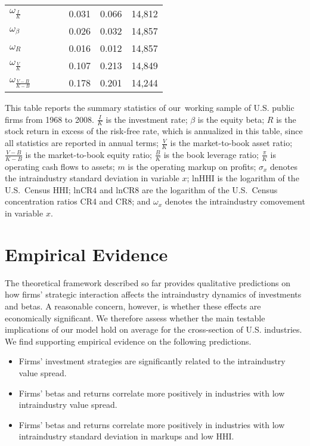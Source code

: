 \documentclass[nogrid,nosurname,sort&compress]{RFS}
\begin{document}
\begin{table}[!t]
{\begin{tabular*}{\textwidth}{@{\extracolsep{\fill}}lrrrrrr@{}}
$\omega_{\frac{I}{K}}$ &       &       &       & 0.031 & 0.066 & 14,812 \\
$\omega_{\beta}$ &       &       &       & 0.026 & 0.032 & 14,857 \\
$\omega_{R}$ &       &       &       & 0.016 & 0.012 & 14,857 \\
$\omega_{\frac{V}{K}}$ &       &       &       & 0.107 & 0.213 & 14,849 \\
$\omega_{\frac{V-B}{K-B}}$ &       &       &       & 0.178 & 0.201 & 14,244 \\\bottomrule
\end{tabular*}}
{This table reports the summary statistics of our\ working sample of U.S.
public firms from 1968 to 2008. $\frac{I}{K}$ is the investment rate; $%
\beta $ is the equity beta; $R$ is the stock return in excess of the risk-free rate, which is
annualized in this table, since all statistics are
reported in annual terms; $\frac{V}{K}$ is the market-to-book asset ratio; $%
\frac{V-B}{K-B}$ is the market-to-book equity ratio; $\frac{B}{K}$ is the book leverage ratio;
$\frac{\pi }{K}$ is operating cash flows to assets; $m$ is the operating markup on profits;
$\sigma _{x}$ denotes the intraindustry standard deviation in variable $x$; lnHHI is the logarithm
of the U.S.\ Census HHI; lnCR4 and lnCR8 are the logarithm of the U.S.\ Census concentration
ratios CR4 and CR8; and $\omega _{x}$ denotes the intraindustry comovement in variable $x$.}
\end{table}



\section{Empirical Evidence}\label{s3}

The theoretical framework described so far provides qualitative predictions on how firms'
strategic interaction affects the intraindustry dynamics of investments and betas. A reasonable
concern, however, is whether these effects are economically significant. We therefore assess
whether the main testable implications of our model hold on average for the cross-section of U.S.
industries. We find supporting empirical evidence on the following predictions.
\begin{itemize}
\item Firms' investment strategies are significantly related to the
intraindustry value spread.

\item Firms' betas and returns correlate more positively in industries with
low intraindustry value spread.

\item Firms' betas and returns correlate more positively in industries with
low intraindustry standard deviation in markups and low HHI.
\end{itemize}
\end{document}
